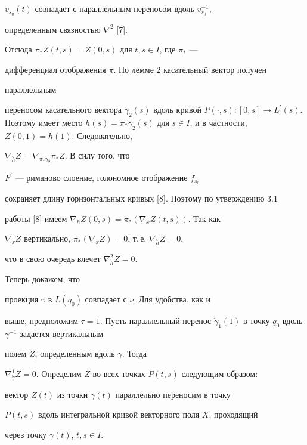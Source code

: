 \begin{pf}
$v_{s_0}(t)$ совпадает с параллельным переносом вдоль $v_{s_0}^{-1}$,


определенным связностью $\nabla^2$ [7].





Отсюда $\pi_*Z(t, s)=Z(0, s)$ для $t, s\in I$, где $\pi_*$ ---


дифференциал отображения $\pi$. По лемме 2 касательный вектор получен


параллельным 


переносом касательного вектора $\Dot \gamma_2(s)$ вдоль кривой $P(\cdot, 


s):[0, s]\to L^\prime(s)$. Поэтому имеет место $\Dot h(s)=\pi_*\Dot 


\gamma_2(s)$ для $s\in I$, и в частности, $Z(0, 1)=\Dot h(1)$. Следовательно, 


$\nabla_{\Dot h}Z=\nabla_{\pi_*\Dot \gamma_2}\pi_*Z$. В силу того, что 


$F^\prime $ --- риманово слоение, голономное отображение $f_{s_0}$ 


сохраняет длину горизонтальных кривых [8]. Поэтому по утверждению 3.1 


работы [8] имеем $\nabla_{\Dot h}Z(0, s) = \pi_* (\nabla_xZ(t,s))$. Так как 


$\nabla_xZ$ вертикально, $\pi_*(\nabla_xZ )=0$, т.\,е. $\nabla_{\Dot h}Z=0$, 


что в свою очередь влечет $\nabla^2_{\Dot h}Z=0$. 





Теперь докажем, что 


проекция $\gamma$ в $L(q_0)$ совпадает с $\nu$. Для удобства, как и 


выше, предположим $\tau=1$. Пусть параллельный перенос $\Dot 


\gamma_1(1)$ в точку $q_0$ вдоль $\gamma^{-1}$ задается вертикальным 


полем $Z$, определенным вдоль $\gamma$. Тогда 


$\nabla^1_{\Dot \gamma }Z=0$. Определим $Z$ во всех точках $P(t,s)$ следующим образом: 


вектор $Z(t)$ из точки $\gamma (t)$ параллельно переносим в точку 


$P(t,s)$ вдоль интегральной кривой векторного поля $X$, проходящий 


через точку $\gamma (t)$, $t,s\in I$. 






\end{pf}

